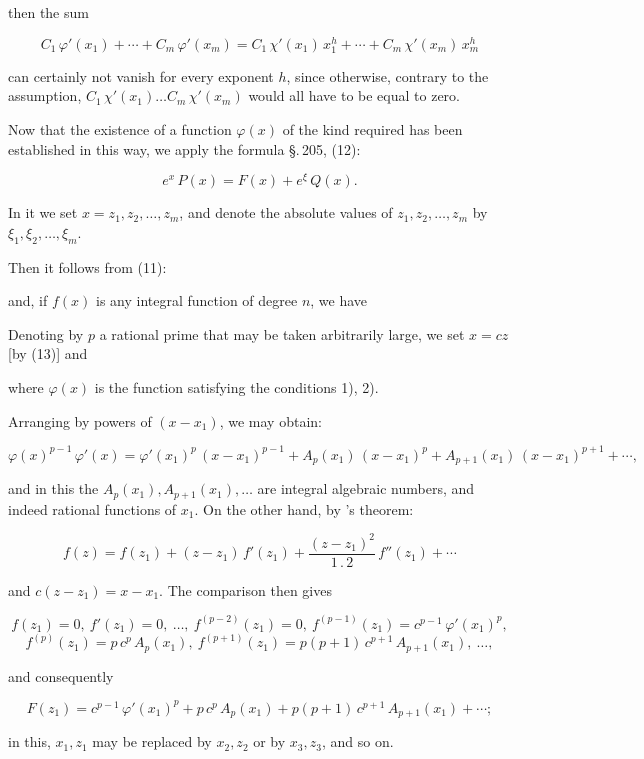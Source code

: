 then the sum

\[
C_1\,\varphi'(x_1)+\cdots+C_m\,\varphi'(x_m) = C_1\,\chi'(x_1)\,x_1^h+\cdots+C_m\,\chi'(x_m)\,x_m^h
\]

can certainly not vanish for every exponent $h$, since otherwise, contrary to the assumption, $C_1\,\chi'(x_1)\ldots C_m\,\chi'(x_m)$ would all have to be equal to zero.

Now that the existence of a function $\varphi(x)$ of the kind required has been established in this way, we apply the formula \S.\,205, (12):

\[
e^x\,P(x) = F(x) + e^{\xi}\,Q(x).
\]

In it we set $x=z_1, z_2, \ldots, z_m$, and denote the absolute values of $z_1, z_2, \ldots, z_m$ by $\xi_1, \xi_2, \ldots, \xi_m$.

Then it follows from (11):


and, if $f(x)$ is any integral function of degree $n$, we have


Denoting by $p$ a rational prime that may be taken arbitrarily large, we set $x=cz$ [by (13)] and


where $\varphi(x)$ is the function satisfying the conditions 1), 2).

Arranging by powers of $(x-x_1)$, we may obtain:

\[
\varphi(x)^{p-1}\,\varphi'(x) = \varphi'(x_1)^p\,(x-x_1)^{p-1}+A_p(x_1)\,(x-x_1)^p+A_{p+1}(x_1)\,(x-x_1)^{p+1}+\cdots,
\]

and in this the $A_p(x_1), A_{p+1}(x_1), \ldots$ are integral algebraic numbers, and indeed rational functions of $x_1$. On the other hand, by 's theorem:

\[
f(z) = f(z_1)+(z-z_1)\,f'(z_1)+\dfrac{(z-z_1)^2}{1\,.\,2}\,f''(z_1)+\cdots
\]

and $c(z-z_1)=x-x_1$. The comparison then gives

\[
f(z_1)=0,\ f'(z_1)=0,\ \ldots,\ f^{(p-2)}(z_1)=0,\ f^{(p-1)}(z_1)=c^{p-1}\,\varphi'(x_1)^p,
\]
\[
f^{(p)}(z_1)=p\,c^p\,A_p(x_1),\ f^{(p+1)}(z_1)=p(p+1)\,c^{p+1}\,A_{p+1}(x_1),\ \ldots,
\]

and consequently

\[
F(z_1) = c^{p-1}\,\varphi'(x_1)^p+p\,c^p\,A_p(x_1)+p(p+1)\,c^{p+1}\,A_{p+1}(x_1)+\cdots;
\]

in this, $x_1, z_1$ may be replaced by $x_2, z_2$ or by $x_3, z_3$, and so on.
